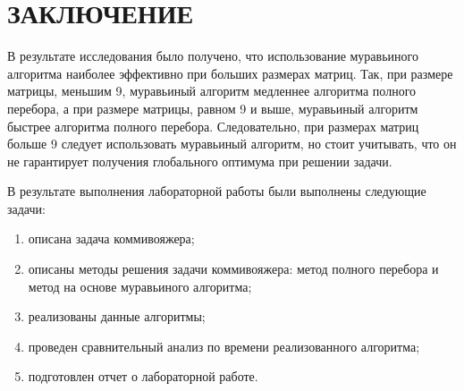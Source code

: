 \chapter*{\hfill{\centering ЗАКЛЮЧЕНИЕ}\hfill}

В результате исследования было получено, что использование муравьиного алгоритма наиболее эффективно при больших размерах матриц. Так, при размере матрицы, меньшим 9, муравьиный алгоритм медленнее алгоритма полного перебора, а при размере матрицы, равном 9 и  выше, муравьиный алгоритм быстрее алгоритма полного перебора. 
Следовательно, при размерах матриц больше 9 следует использовать муравьиный алгоритм, но стоит учитывать, что он не гарантирует получения глобального оптимума при решении задачи.

В результате выполнения лабораторной работы были выполнены следующие задачи:

\begin{enumerate}[label={\arabic*)}]
	\item описана задача коммивояжера;
	\item описаны методы решения задачи коммивояжера: метод полного перебора и метод на основе муравьиного алгоритма;
	\item реализованы данные алгоритмы;
	\item проведен сравнительный анализ по времени реализованного алгоритма;
	\item подготовлен отчет о лабораторной работе.
\end{enumerate}